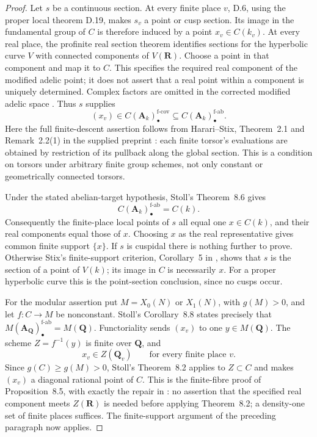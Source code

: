 \begin{proof}
Let $s$ be a continuous section. At every finite place $v$, D.6, using
the proper local theorem D.19, makes $s_v$ a point or cusp section.
Its image in the fundamental group of $C$ is therefore induced by a
point $x_v\in C(k_v)$. At every real place, the profinite real section
theorem \cite[Corollary~3.13]{D_Mochizuki2003Real} identifies sections
for the hyperbolic curve $V$ with connected components of $V(\mathbf R)$.
Choose a point in that component and map it to $C$. This specifies the
required real component of the modified adelic point; it does not
assert that a real point within a component is uniquely determined.
Complex factors are omitted in the corrected modified adelic space
\cite[Section~1]{D_StollErrata2017}. Thus $s$ supplies
\[
 (x_v)\in C(\mathbf A_k)_\bullet^{\mathrm{f\text{-}cov}}
 \subseteq C(\mathbf A_k)_\bullet^{\mathrm{f\text{-}ab}}.
\]
Here the full finite-descent assertion follows from Harari--Stix,
Theorem~2.1 and Remark~2.2(1) in the supplied preprint
\cite{D_HarariStix2012}: each finite torsor's evaluations are obtained
by restriction of its pullback along the global section. This is a
condition on torsors under arbitrary finite group schemes, not only
constant or geometrically connected torsors.

Under the stated abelian-target hypothesis, Stoll's Theorem~8.6
\cite{D_Stoll2007} gives
\[
 C(\mathbf A_k)_\bullet^{\mathrm{f\text{-}ab}}=C(k).
\]
Consequently the finite-place local points of $s$ all equal one
$x\in C(k)$, and their real components equal those of $x$. Choosing
$x$ as the real representative gives common finite support $\{x\}$.
If $s$ is cuspidal there is nothing further to prove. Otherwise Stix's
finite-support criterion, Corollary~5 in \cite{D_Stix2015}, shows
that $s$ is the section of a point of $V(k)$; its image in $C$ is
necessarily $x$. For a proper hyperbolic curve this is the point-section
conclusion, since no cusps occur.

For the modular assertion put $M=X_0(N)$ or $X_1(N)$, with
$g(M)>0$, and let $f:C\to M$ be nonconstant. Stoll's Corollary~8.8
states precisely that
$M(\mathbf A_{\mathbf Q})_\bullet^{\mathrm{f\text{-}ab}}=M(\mathbf Q)$.
Functoriality sends $(x_v)$ to one $y\in M(\mathbf Q)$.
The scheme $Z=f^{-1}(y)$ is finite over $\mathbf Q$, and
\[
 x_v\in Z(\mathbf Q_v)\qquad\text{for every finite place }v.
\]
Since $g(C)\geq g(M)>0$, Stoll's Theorem~8.2 applies to $Z\subset C$
and makes $(x_v)$ a diagonal rational point of $C$. This is the
finite-fibre proof of Proposition~8.5, with exactly the repair in
\cite[Section~3]{D_StollErrata2017}: no assertion that the specified
real component meets $Z(\mathbf R)$ is needed before applying
Theorem~8.2; a density-one set of finite places suffices. The
finite-support argument of the preceding paragraph now applies.
\end{proof}

